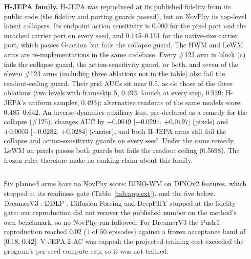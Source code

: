 \begin{revblock}
\textbf{H-JEPA family.} H-JEPA \citep{zhang2026hjepa} was reproduced at its published fidelity from its public code (the fidelity and porting guards passed), but on NovPhy its top-level latent collapses. Its endpoint action sensitivity is 0.000 for the pixel port and the matched carrier port on every seed, and 0.145--0.161 for the native-size carrier port, which passes G-action but fails the collapse guard. The HWM and LeWM arms are re-implementations in the same codebase. Every \#123 arm in block (c) fails the collapse guard, the action-sensitivity guard, or both, and seven of the eleven \#123 arms (including three ablations not in the table) also fail the readout-ceiling guard. Their grid AUCs sit near 0.5, as do those of the three ablations (two levels with frameskip 5, 0.493; launch at every step, 0.539; H-JEPA's uniform sampler, 0.493); alternative readouts of the same models score 0.485--0.642. An inverse-dynamics auxiliary loss, pre-declared as a remedy for the collapse (\#125), changes AUC by $-0.0049$ [$-0.0291$, $+0.0197$] (pixels) and $+0.0003$ [$-0.0282$, $+0.0284$] (carrier), and both H-JEPA arms still fail the collapse and action-sensitivity guards on every seed. Under the same remedy, LeWM on pixels passes both guards but fails the readout ceiling (0.5698). The frozen rules therefore make no ranking claim about this family.
\end{revblock}

\subsection{\texorpdfstring{}{Arms that were not run}}
\label{sec:app:ext:notrun}

\begin{revblock}
\nopagebreak
Six planned arms have no NovPhy score: DINO-WM on DINOv2 features, which stopped at its readiness gate (Table~\ref{tab:app:ext}), and the five below. DreamerV3 \citep{hafner2025dreamerv3}, DDLP \citep{daniel2024ddlp}, Diffusion Forcing \citep{chen2024diffusionforcing} and DeepPHY \citep{xu2025deepphy} stopped at the fidelity gate: our reproduction did not recover the published number on the method's own benchmark, so no NovPhy run followed. For DreamerV3 the PushT reproduction reached 0.02 (1 of 50 episodes) against a frozen acceptance band of [0.18, 0.42]. V-JEPA 2-AC \citep{assran2025vjepa2} was capped: the projected training cost exceeded the program's per-seed compute cap, so it was not trained.
\end{revblock}

